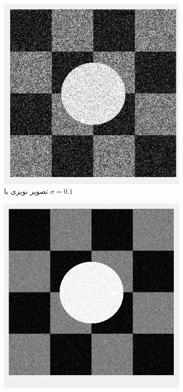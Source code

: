 \documentclass[11.5pt,a4paper]{article}
\begin{document}
\begin{figure}[h]
\center
	\begin{subfigure}{0.3\textwidth}
	\includegraphics[scale=0.3]{Imgs/MRF_S1_In.png}
	\caption{تصویر نویزی با $\sigma=0.1$}
	\end{subfigure}
	\begin{subfigure}{0.3\textwidth}
	\includegraphics[scale=0.3]{Imgs/MRF_S01_In.png}

\end{subfigure}
\end{figure}
\end{document}
